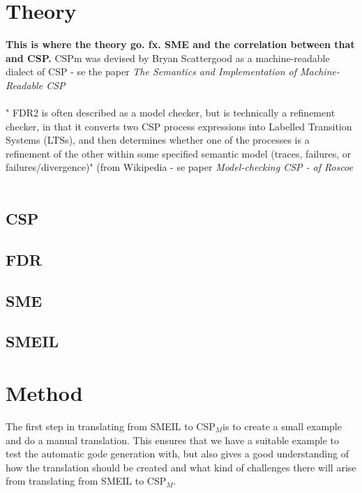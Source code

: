 \documentclass[a4paper]{report}
\newcommand{\cspm}{CSP$_M$}
\begin{document}
\chapter{Theory}
\textbf{This is where the theory go. fx. SME and the correlation between that and CSP.}
CSPm was devised by Bryan Scattergood as a machine-readable dialect of CSP  - se the paper \textit{The Semantics and Implementation of Machine-Readable CSP}\\\\
" FDR2 is often described as a model checker, but is technically a refinement checker, in that it converts two CSP process expressions into Labelled Transition Systems (LTSs), and then determines whether one of the processes is a refinement of the other within some specified semantic model (traces, failures, or failures/divergence)" (from Wikipedia - se paper \textit{Model-checking CSP - af Roscoe} \\\\
\section{CSP}
\section{FDR}
\section{SME}
\section{SMEIL}
\chapter{Method}
The first step in translating from SMEIL to \cspm is to create a small example and do a manual translation. This ensures that we have a suitable example to test the automatic gode generation with, but also gives a good understanding of how the translation should be created and what kind of challenges there will arise from translating from SMEIL to \cspm. 
\end{document}
